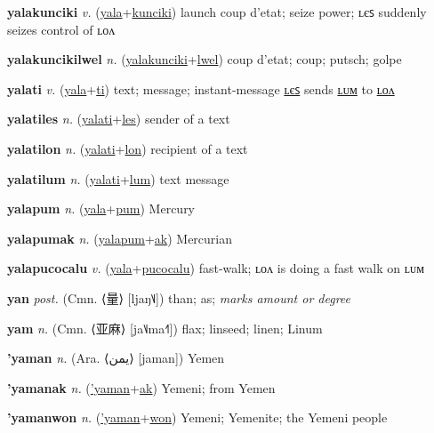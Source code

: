 \textbf{\hypertarget{yalakunciki}{yalakunciki}} \textit{v.} (\hyperlink{yala}{yala}+\allowbreak \hyperlink{kunciki}{kunciki})
launch coup d’etat; seize power; ʟєꜱ suddenly seizes control of ʟᴏᴧ

\textbf{\hypertarget{yalakuncikilwel}{yalakuncikilwel}} \textit{n.} (\hyperlink{yalakunciki}{yalakunciki}+\allowbreak \hyperlink{lwel}{lwel})
coup d’etat; coup; putsch; golpe

\textbf{\hypertarget{yalati}{yalati}} \textit{v.} (\hyperlink{yala}{yala}+\allowbreak \hyperlink{ti}{ti})
text; message; instant-message \hyperlink{yalatiles}{ʟєꜱ} sends \hyperlink{yalatilum}{ʟᴜᴍ} to \hyperlink{yalatilon}{ʟᴏᴧ}

\textbf{\hypertarget{yalatiles}{yalatiles}} \textit{n.} (\hyperlink{yalati}{yalati}+\allowbreak \hyperlink{les}{les})
sender of a text

\textbf{\hypertarget{yalatilon}{yalatilon}} \textit{n.} (\hyperlink{yalati}{yalati}+\allowbreak \hyperlink{lon}{lon})
recipient of a text

\textbf{\hypertarget{yalatilum}{yalatilum}} \textit{n.} (\hyperlink{yalati}{yalati}+\allowbreak \hyperlink{lum}{lum})
text message

\textbf{\hypertarget{yalapum}{yalapum}} \textit{n.} (\hyperlink{yala}{yala}+\allowbreak \hyperlink{pum}{pum})
Mercury

\textbf{\hypertarget{yalapumak}{yalapumak}} \textit{n.} (\hyperlink{yalapum}{yalapum}+\allowbreak \hyperlink{ak}{ak})
Mercurian

\textbf{\hypertarget{yalapucocalu}{yalapucocalu}} \textit{v.} (\hyperlink{yala}{yala}+\allowbreak \hyperlink{pucocalu}{pucocalu})
fast-walk; ʟᴏᴧ is doing a fast walk on ʟᴜᴍ

\textbf{\hypertarget{yan}{yan}} \textit{post.} (Cmn. ⟨{\chinese{}量}⟩ [ljaŋ˥˩])
than; as; \textit{marks amount or degree}

\textbf{\hypertarget{yam}{yam}} \textit{n.} (Cmn. ⟨{\chinese{}亚麻}⟩ [ja˥˩ma˧˥])
flax; linseed; linen; Linum

\textbf{\hypertarget{'yaman}{'yaman}} \textit{n.} (Ara. ⟨{\arabics{}يمن}⟩ [jaman])
Yemen

\textbf{\hypertarget{'yamanak}{'yamanak}} \textit{n.} (\hyperlink{'yaman}{'yaman}+\allowbreak \hyperlink{ak}{ak})
Yemeni; from Yemen

\textbf{\hypertarget{'yamanwon}{'yamanwon}} \textit{n.} (\hyperlink{'yaman}{'yaman}+\allowbreak \hyperlink{won}{won})
Yemeni; Yemenite; the Yemeni people

